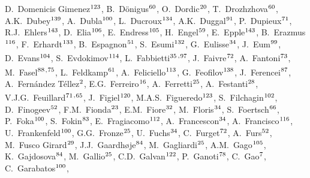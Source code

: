 \begin{flushleft}
D.~Domenicis Gimenez$^\textrm{\scriptsize 123}$,
B.~D\"{o}nigus$^\textrm{\scriptsize 60}$,
O.~Dordic$^\textrm{\scriptsize 20}$,
T.~Drozhzhova$^\textrm{\scriptsize 60}$,
A.K.~Dubey$^\textrm{\scriptsize 139}$,
A.~Dubla$^\textrm{\scriptsize 100}$,
L.~Ducroux$^\textrm{\scriptsize 134}$,
A.K.~Duggal$^\textrm{\scriptsize 91}$,
P.~Dupieux$^\textrm{\scriptsize 71}$,
R.J.~Ehlers$^\textrm{\scriptsize 143}$,
D.~Elia$^\textrm{\scriptsize 106}$,
E.~Endress$^\textrm{\scriptsize 105}$,
H.~Engel$^\textrm{\scriptsize 59}$,
E.~Epple$^\textrm{\scriptsize 143}$,
B.~Erazmus$^\textrm{\scriptsize 116}$,
F.~Erhardt$^\textrm{\scriptsize 133}$,
B.~Espagnon$^\textrm{\scriptsize 51}$,
S.~Esumi$^\textrm{\scriptsize 132}$,
G.~Eulisse$^\textrm{\scriptsize 34}$,
J.~Eum$^\textrm{\scriptsize 99}$,
D.~Evans$^\textrm{\scriptsize 104}$,
S.~Evdokimov$^\textrm{\scriptsize 114}$,
L.~Fabbietti$^\textrm{\scriptsize 35}$\textsuperscript{,}$^\textrm{\scriptsize 97}$,
J.~Faivre$^\textrm{\scriptsize 72}$,
A.~Fantoni$^\textrm{\scriptsize 73}$,
M.~Fasel$^\textrm{\scriptsize 88}$\textsuperscript{,}$^\textrm{\scriptsize 75}$,
L.~Feldkamp$^\textrm{\scriptsize 61}$,
A.~Feliciello$^\textrm{\scriptsize 113}$,
G.~Feofilov$^\textrm{\scriptsize 138}$,
J.~Ferencei$^\textrm{\scriptsize 87}$,
A.~Fern\'{a}ndez T\'{e}llez$^\textrm{\scriptsize 2}$,
E.G.~Ferreiro$^\textrm{\scriptsize 16}$,
A.~Ferretti$^\textrm{\scriptsize 25}$,
A.~Festanti$^\textrm{\scriptsize 28}$,
V.J.G.~Feuillard$^\textrm{\scriptsize 71}$\textsuperscript{,}$^\textrm{\scriptsize 65}$,
J.~Figiel$^\textrm{\scriptsize 120}$,
M.A.S.~Figueredo$^\textrm{\scriptsize 123}$,
S.~Filchagin$^\textrm{\scriptsize 102}$,
D.~Finogeev$^\textrm{\scriptsize 52}$,
F.M.~Fionda$^\textrm{\scriptsize 23}$,
E.M.~Fiore$^\textrm{\scriptsize 32}$,
M.~Floris$^\textrm{\scriptsize 34}$,
S.~Foertsch$^\textrm{\scriptsize 66}$,
P.~Foka$^\textrm{\scriptsize 100}$,
S.~Fokin$^\textrm{\scriptsize 83}$,
E.~Fragiacomo$^\textrm{\scriptsize 112}$,
A.~Francescon$^\textrm{\scriptsize 34}$,
A.~Francisco$^\textrm{\scriptsize 116}$,
U.~Frankenfeld$^\textrm{\scriptsize 100}$,
G.G.~Fronze$^\textrm{\scriptsize 25}$,
U.~Fuchs$^\textrm{\scriptsize 34}$,
C.~Furget$^\textrm{\scriptsize 72}$,
A.~Furs$^\textrm{\scriptsize 52}$,
M.~Fusco Girard$^\textrm{\scriptsize 29}$,
J.J.~Gaardh{\o}je$^\textrm{\scriptsize 84}$,
M.~Gagliardi$^\textrm{\scriptsize 25}$,
A.M.~Gago$^\textrm{\scriptsize 105}$,
K.~Gajdosova$^\textrm{\scriptsize 84}$,
M.~Gallio$^\textrm{\scriptsize 25}$,
C.D.~Galvan$^\textrm{\scriptsize 122}$,
P.~Ganoti$^\textrm{\scriptsize 78}$,
C.~Gao$^\textrm{\scriptsize 7}$,
C.~Garabatos$^\textrm{\scriptsize 100}$,

\end{flushleft}

